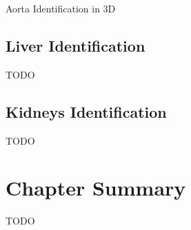 \begin{stulisting}[p]
\caption{Aorta Identification in 3D}
\label{code:featureid-3d-aortaidentification}

\end{stulisting}

\subsection{Liver Identification}

TODO

\subsection{Kidneys Identification}

TODO

\section{Chapter Summary}

TODO
